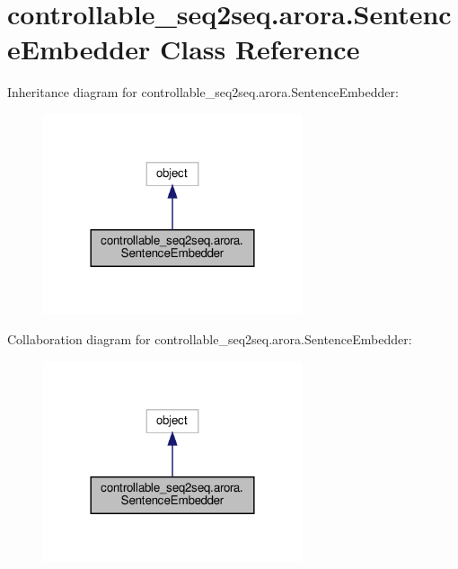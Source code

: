 \hypertarget{classcontrollable__seq2seq_1_1arora_1_1SentenceEmbedder}{}\section{controllable\+\_\+seq2seq.\+arora.\+Sentence\+Embedder Class Reference}
\label{classcontrollable__seq2seq_1_1arora_1_1SentenceEmbedder}


Inheritance diagram for controllable\+\_\+seq2seq.\+arora.\+Sentence\+Embedder\+:
\nopagebreak
\begin{figure}[H]
\begin{center}
\leavevmode
\includegraphics[width=216pt]{classcontrollable__seq2seq_1_1arora_1_1SentenceEmbedder__inherit__graph}
\end{center}
\end{figure}


Collaboration diagram for controllable\+\_\+seq2seq.\+arora.\+Sentence\+Embedder\+:
\nopagebreak
\begin{figure}[H]
\begin{center}
\leavevmode
\includegraphics[width=216pt]{classcontrollable__seq2seq_1_1arora_1_1SentenceEmbedder__coll__graph}
\end{center}
\end{figure}
